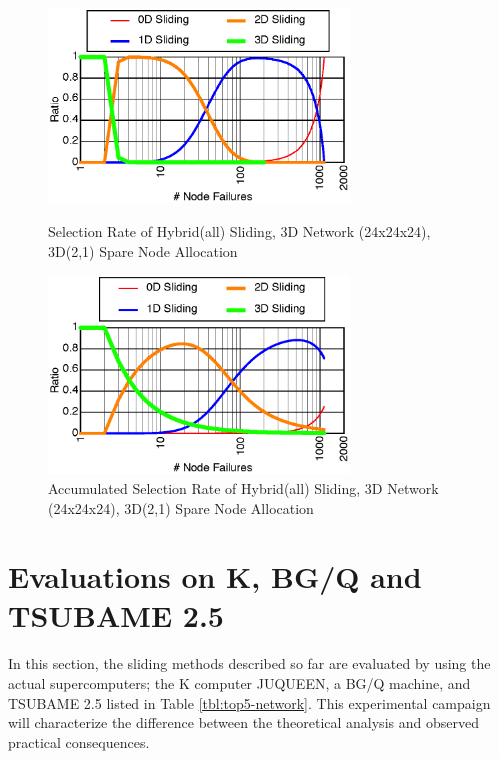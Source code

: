 \documentclass[Afour,times,sageh]{sagej}
\begin{document}
\begin{figure}[ht]
\centering
\includegraphics[width=80mm]{Figs/HYB-24x24x24-Sel-CL.eps}
  \caption{Selection Rate of Hybrid(all) Sliding, 3D Network
    (24x24x24), 3D(2,1) Spare Node Allocation}
\label{fig:sel-rate}
\vspace{5mm}
\includegraphics[width=80mm]{Figs/HYB-24x24x24-SelA-CL.eps}
  \caption{Accumulated Selection Rate of Hybrid(all) Sliding,
    3D Network (24x24x24), 3D(2,1) Spare Node Allocation}
\label{fig:sel-rateA}
\end{figure}

\section{Evaluations on K, BG/Q and TSUBAME 2.5}
\label{sec:eval}

In this section, the sliding methods described so far are evaluated by
using the actual supercomputers; the K computer
JUQUEEN\citep{JUQUEEN}, a BG/Q machine, and TSUBAME 2.5
listed in Table \ref{tbl:top5-network}.
This experimental campaign will characterize the difference
between the theoretical analysis and observed practical consequences.
\end{document}
